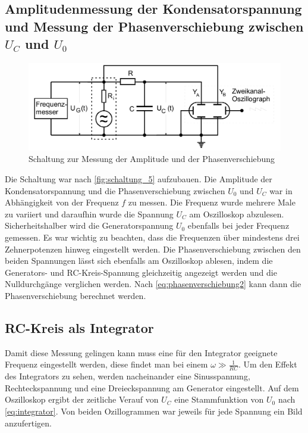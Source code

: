 \subsection{Amplitudenmessung der Kondensatorspannung und Messung der Phasenverschiebung zwischen $U_C$ und $U_0$}
\label{sec:Durchführung_2}

\begin{figure}
    \centering
    \includegraphics[width=\textwidth/2]{images/schaltung_5.png}
    \caption{Schaltung zur Messung der Amplitude und der Phasenverschiebung  \cite{V353}}
    \label{fig:schaltung_5}
\end{figure}

Die Schaltung war nach \autoref{fig:schaltung_5} aufzubauen. 
Die Amplitude der Kondensatorspannung und die Phasenverschiebung zwischen $U_0$ und $U_C$ war in Abhängigkeit von der Frequenz $f$ zu messen. 
Die Frequenz wurde mehrere Male zu variiert und daraufhin wurde die Spannung $U_C$ am Oszilloskop abzulesen.
Sicherheitshalber wird die Generatorspannung $U_0$ ebenfalls bei jeder Frequenz gemessen. 
Es war wichtig zu beachten, dass die Frequenzen über mindestens drei Zehnerpotenzen hinweg eingestellt werden. 
Die Phasenverschiebung zwischen den beiden Spannungen lässt sich ebenfalls am Oszilloskop ablesen, indem die Generators- und RC-Kreis-Spannung gleichzeitig angezeigt werden und die Nulldurchgänge verglichen werden.
Nach \autoref{eq:phasenverschiebung2} kann dann die Phasenverschiebung berechnet werden. 

\subsection{RC-Kreis als Integrator}
\label{sec:Durchführung_3}

Damit diese Messung gelingen kann muss eine für den Integrator geeignete Frequenz eingestellt werden, diese findet man bei einem $\omega \gg \frac{1}{RC}$. 
Um den Effekt des Integrators zu sehen, werden nacheinander eine Sinusspannung, Rechteckspannung und eine Dreieckspannung am Generator eingestellt. 
Auf dem Oszilloskop ergibt der zeitliche Verauf von $U_C$ eine Stammfunktion von $U_0$ nach \autoref{eq:integrator}. Von beiden Ozillogrammen war jeweils für jede Spannung ein Bild anzufertigen.